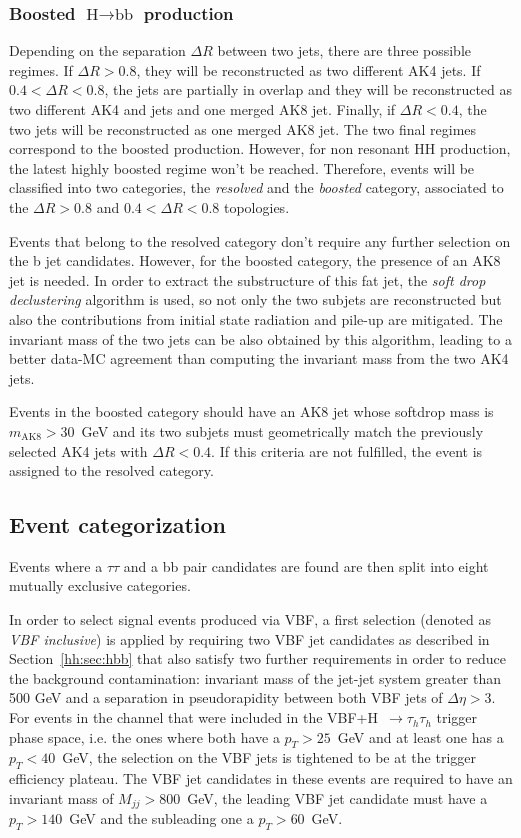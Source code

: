 \documentclass[../main.tex]{subfiles}
\begin{document}
\subsubsection{Boosted $\text{H}\to\text{bb}$ production}

Depending on the separation $\Delta R$ between two jets, there are three possible regimes. If $\Delta R > 0.8$, they will be reconstructed as two different AK4 jets. If $0.4 < \Delta R < 0.8$, the jets are partially in overlap and they will be reconstructed as two different AK4 and jets and one merged AK8 jet. Finally, if $\Delta R < 0.4$, the two jets will be reconstructed as one merged AK8 jet. The two final regimes correspond to the boosted production. However, for non resonant HH production, the latest highly boosted regime won't be reached. Therefore, events will be classified into two categories, the \textit{resolved} and the \textit{boosted} category, associated to the $\Delta R > 0.8$ and $0.4 < \Delta R < 0.8$ topologies.

Events that belong to the resolved category don't require any further selection on the b jet candidates. However, for the boosted category, the presence of an AK8 jet is needed. In order to extract the substructure of this fat jet, the \textit{soft drop declustering} \cite{hh:analysis:softdrop} algorithm is used, so not only the two subjets are reconstructed but also the contributions from initial state radiation and pile-up are mitigated. The invariant mass of the two jets can be also obtained by this algorithm, leading to a better data-MC agreement than computing the invariant mass from the two AK4 jets.

Events in the boosted category should have an AK8 jet whose softdrop mass is $m_\text{AK8} > 30$~GeV and its two subjets must geometrically match the previously selected AK4 jets with $\Delta R < 0.4$. If this criteria are not fulfilled, the event is assigned to the resolved category.

\subsection{Event categorization}
\label{hh:sec:event_categorization}

Events where a $\tau\tau$ and a bb pair candidates are found are then split into eight mutually exclusive categories. 

In order to select signal events produced via VBF, a first selection (denoted as \textit{VBF inclusive}) is applied by requiring two VBF jet candidates as described in Section~\ref{hh:sec:hbb} that also satisfy two further requirements in order to reduce the background contamination: invariant mass of the jet-jet system greater than 500 GeV and a separation in pseudorapidity between both VBF jets of $\Delta\eta>3$. For events in the \tauh\tauh{} channel that were included in the VBF+H~$\to\tau_h\tau_h$ trigger phase space, i.e. the ones where both \tauh{} have a $p_T>25$~GeV and at least one has a $p_T<40$~GeV, the selection on the VBF jets is tightened to be at the trigger efficiency plateau. The VBF jet candidates in these events are required to have an invariant mass of $M_{jj}>800$~GeV, the leading VBF jet candidate must have a $p_T>140$~GeV and the subleading one a $p_T>60$~GeV.
\end{document}
